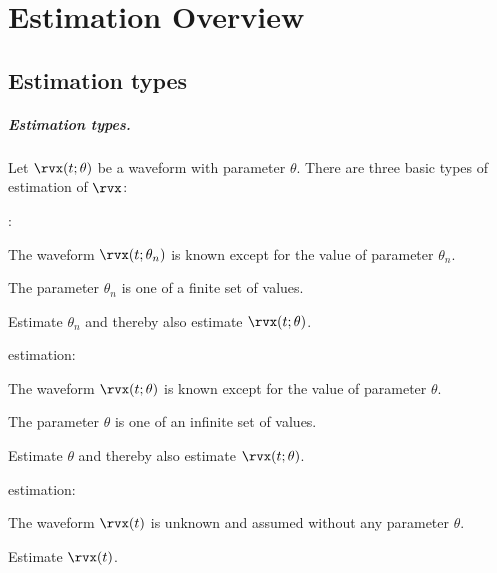 
\chapter{Estimation Overview}
\label{app:est}
\section{Estimation types}
\paragraph{Estimation types.}
Let $\rvx(t;\theta)$ be a waveform with parameter $\theta$.
There are three basic types of estimation of $\rvx$:

\begin{enume}
   \item {}:
      \begin{liste}
         \item The waveform $\rvx(t;\theta_n)$ is known except for the value of parameter $\theta_n$.
         \item The parameter $\theta_n$ is one of a finite set of values.
         \item Estimate $\theta_n$ and thereby also estimate $\rvx(t;\theta)$.
      \end{liste}
   \item {} estimation:
      \begin{liste}
         \item The waveform $\rvx(t;\theta)$ is known except for the value of parameter $\theta$.
         \item The parameter $\theta$ is one of an infinite set of values.
         \item Estimate $\theta$ and thereby also estimate $\rvx(t;\theta)$.
      \end{liste}
   \item {} estimation:
      \begin{liste}
         \item The waveform $\rvx(t)$ is unknown and assumed without any parameter $\theta$.
         \item Estimate $\rvx(t)$.
      \end{liste}
\end{enume}

